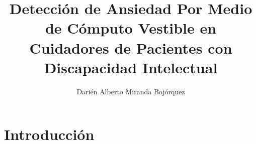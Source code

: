 \documentclass[letterpaper,12pt]{cicese}
\begin{document}
	\doublespace
	\title{Detecci\'on de Ansiedad Por Medio de C\'omputo Vestible en Cuidadores de Pacientes con Discapacidad Intelectual}
	\author{Dari\'en Alberto Miranda Boj\'orquez}
	\maketitle
	\newpage
	\tableofcontents
	\newpage
		\chapter{Introducci\'on} 
			
\end{document}
